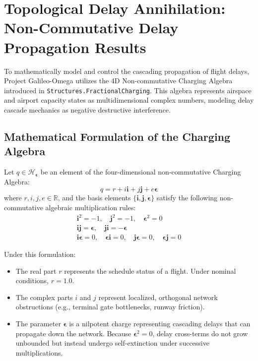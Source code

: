 \documentclass[11pt,a4paper]{book}
\begin{document}
\section{Topological Delay Annihilation: Non-Commutative Delay Propagation Results}\label{sec:topological_delay_results}

To mathematically model and control the cascading propagation of flight delays, Project Galileo-Omega utilizes the 4D Non-commutative Charging Algebra introduced in \texttt{Structures.FractionalCharging}. This algebra represents airspace and airport capacity states as multidimensional complex numbers, modeling delay cascade mechanics as negative destructive interference.

\subsection{Mathematical Formulation of the Charging Algebra}\label{subsec:charging_algebra_form}

Let $q \in \mathcal{H}_{\bm{\epsilon}}$ be an element of the four-dimensional non-commutative Charging Algebra:
\begin{equation}
\label{eq:charging_element}
q = r + i\mathbf{i} + j\mathbf{j} + e\bm{\epsilon}
\end{equation}
where $r, i, j, e \in \mathbb{R}$, and the basis elements $\{\mathbf{i}, \mathbf{j}, \bm{\epsilon}\}$ satisfy the following non-commutative algebraic multiplication rules:
\begin{align}
\label{eq:multiplication_rules}
\mathbf{i}^2 = -1, \quad \mathbf{j}^2 = -1, \quad \bm{\epsilon}^2 = 0 \\
\mathbf{i}\mathbf{j} = \bm{\epsilon}, \quad \mathbf{j}\mathbf{i} = -\bm{\epsilon} \\
\mathbf{i}\bm{\epsilon} = 0, \quad \bm{\epsilon}\mathbf{i} = 0, \quad \mathbf{j}\bm{\epsilon} = 0, \quad \bm{\epsilon}\mathbf{j} = 0
\end{align}

Under this formulation:
\begin{itemize}
    \item The real part $r$ represents the schedule status of a flight. Under nominal conditions, $r = 1.0$.
    \item The complex parts $i$ and $j$ represent localized, orthogonal network obstructions (e.g., terminal gate bottlenecks, runway friction).
    \item The parameter $\bm{\epsilon}$ is a nilpotent charge representing cascading delays that can propagate down the network. Because $\bm{\epsilon}^2 = 0$, delay cross-terms do not grow unbounded but instead undergo self-extinction under successive multiplications.
\end{itemize}
\end{document}
